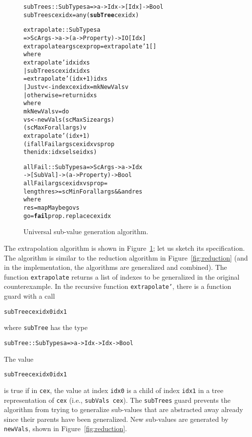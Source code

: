 \documentclass{sigplanconf}
\newenvironment{code}{\begin{alltt}\footnotesize}{\end{alltt}}
\newcommand{\ttp}[1]{\texttt{#1}}
\newcommand{\undef}[1]{{\bf #1}}
\begin{document}
\begin{figure}
  \begin{code}
subTrees :: SubTypes a => a -> Idx -> [Idx] -> Bool
subTrees cex idx = any (\undef{subTree} cex idx)

extrapolate :: SubTypes a
  => ScArgs -> a -> (a -> Property) -> IO [Idx]
extrapolate args cex prop = extrapolate' 1 []
  where
  extrapolate' idx idxs
    | subTrees cex idx idxs
    = extrapolate' (idx+1) idxs
    | Just v <- index cex idx = mkNewVals v
    | otherwise = return idxs
    where
    mkNewVals v = do
      vs <- newVals (scMaxSize args)
                    (scMaxForall args) v
      extrapolate' (idx+1)
        (if allFail args cex idx vs prop
           then idx:idxs else idxs)

allFail :: SubTypes a => ScArgs -> a -> Idx
  -> [SubVal] -> (a -> Property) -> Bool
allFail args cex idx vs prop =
  length res >= scMinForall args && and res
  where
  res  = mapMaybe go vs
  go   = \undef{fail} prop . replace cex idx
  \end{code}
  \caption{Universal sub-value generation algorithm.}
  \label{fig:universal}
\end{figure}

The extrapolation algorithm is shown in Figure~\ref{fig:universal}; let us sketch
its specification.  The algorithm is similar to the reduction algorithm in
Figure~\ref{fig:reduction} (and in the implementation, the algorithms are
generalized and combined).  The function \ttp{extrapolate} returns a list of
indexes to be generalized in the original counterexample.  In the recursive
function \ttp{extrapolate'}, there is a function guard with a call
%
\begin{code}
subTree cex idx0 idx1
\end{code}
%
\noindent
where \ttp{subTree} has the type
%
\begin{code}
subTree :: SubTypes a => a -> Idx -> Idx -> Bool
\end{code}
%
\noindent
The value
%
\begin{code}
subTree cex idx0 idx1
\end{code}
%
is true if in \ttp{cex}, the value at index \ttp{idx0} is a child of index
\ttp{idx1} in a tree representation of \ttp{cex} (i.e., \ttp{subVals cex}).  The
\ttp{subTrees} guard prevents the algorithm from trying to generalize sub-values
that are abstracted away already since their parents have been generalized.
New sub-values are generated by \ttp{newVals}, shown in
Figure~\ref{fig:reduction}.
\end{document}
